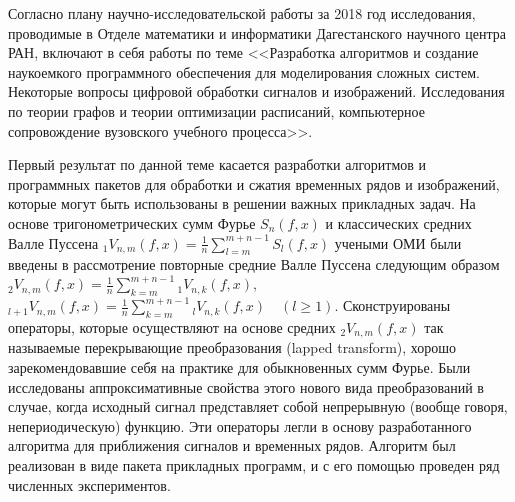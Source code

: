 \Introduction

Согласно плану научно-исследовательской работы за 2018 год исследования, проводимые в Отделе математики и информатики Дагестанского научного центра РАН, включают в себя работы по теме
<<Разработка алгоритмов и создание наукоемкого программного обеспечения для моделирования сложных систем. Некоторые вопросы цифровой обработки сигналов и изображений. Исследования по теории графов и теории оптимизации расписаний, компьютерное сопровождение вузовского учебного процесса>>.













%
%


Первый результат по данной теме касается разработки алгоритмов и программных пакетов для обработки и сжатия временных рядов и изображений, которые могут быть использованы в решении важных прикладных задач. На основе тригонометрических сумм Фурье $S_n(f,x)$ и классических средних Валле Пуссена
$
_1V_{n,m}(f,x)= \frac1n\sum\nolimits_{l=m}^{m+n-1}S_l(f,x)
$
учеными ОМИ были введены в рассмотрение повторные средние Валле Пуссена следующим образом
 $
_2V_{n,m}(f,x)= \frac1n\sum\nolimits_{k=m}^{m+n-1}{}_1V_{n,k}(f,x),
$
$
{}_{l+1}V_{n,m}(f,x)= \frac1n\sum\nolimits_{k=m}^{m+n-1} {}_{l}V_{n,k}(f,x)\quad(l\ge1).
$
Сконструированы операторы, которые осуществляют на основе средних $_2V_{n,m}(f,x)$ так называемые перекрывающие преобразования (lapped transform), хорошо зарекомендовавшие себя на практике для обыкновенных сумм Фурье. Были исследованы аппроксимативные свойства этого нового вида преобразований в случае, когда исходный сигнал представляет собой непрерывную (вообще говоря, непериодическую) функцию. Эти операторы легли в основу разработанного алгоритма для приближения сигналов и временных рядов. Алгоритм был реализован в виде пакета прикладных программ, и с его помощью проведен ряд численных экспериментов.




